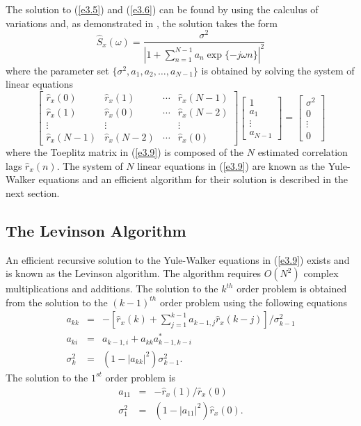 	The solution to (\ref{e3.5}) and (\ref{e3.6}) can be found
by using the calculus of variations \cite{HB} and, as demonstrated in \cite{KM},
the solution takes the form
%
\begin{equation}
     \hat{S}_x(\omega)=
\frac{\sigma^2}{|1+\sum_{n=1}^{N-1}a_n\exp\{-j\omega n\}|^2}
\label{e3.8}
\end{equation}
%
where the parameter set $\{\sigma^2, a_1, a_2, \ldots, a_{N-1}\}$
is obtained by solving the system of linear equations
%
\begin{equation}
\left[ \begin{array}{cccc}
\hat{r}_x(0) & \hat{r}_x(1) & \cdots & \hat{r}_x(N-1) \\
\hat{r}_x(1) & \hat{r}_x(0) & \cdots & \hat{r}_x(N-2) \\
\vdots       & \vdots       &        & \vdots \\
\hat{r}_x(N-1) & \hat{r}_x(N-2) & \cdots & \hat{r}_x(0) 
\end{array}\right]
\left[ \begin{array}{c}
1\\
a_1\\
\vdots\\
a_{N-1}
\end{array}\right]
=
\left[ \begin{array}{c}
\sigma^2\\
0\\
\vdots\\
0
\end{array}\right]
\label{e3.9}
\end{equation}
%
where the Toeplitz matrix in (\ref{e3.9}) is composed of the $N$ estimated
correlation lags $\hat{r}_x(n)$.  The system of $N$ linear equations in (\ref{e3.9})
are known as the Yule-Walker equations and an
efficient algorithm for their solution is described in the next section.

\subsection{The Levinson Algorithm}
\label{levalgo}

	An efficient recursive solution to the Yule-Walker
equations in (\ref{e3.9}) exists and is known as the Levinson
algorithm.  The algorithm requires $O(N^2)$
complex multiplications and additions.  The solution to the 
$k^{th}$ order problem is obtained from the
solution to the $(k-1)^{th}$ order problem using the following
equations
%
\begin{eqnarray}
a_{kk} &=& -[\hat{r}_x(k)+\sum_{j=1}^{k-1}a_{k-1,j}\hat{r}_x(k-j)]/\sigma^2_{k-1}\\
a_{ki} &=& a_{k-1,i}+a_{kk}a^*_{k-1,k-i}\\
\sigma^2_k &=& (1-|a_{kk}|^2)\sigma^2_{k-1}.
\end{eqnarray}
%
The solution to the $1^{st}$ order problem is
%
\begin{eqnarray}
a_{11} &=& -\hat{r}_x(1)/\hat{r}_x(0)\\
\sigma^2_1 &=& (1-|a_{11}|^2)\hat{r}_x(0).
\end{eqnarray}
%
